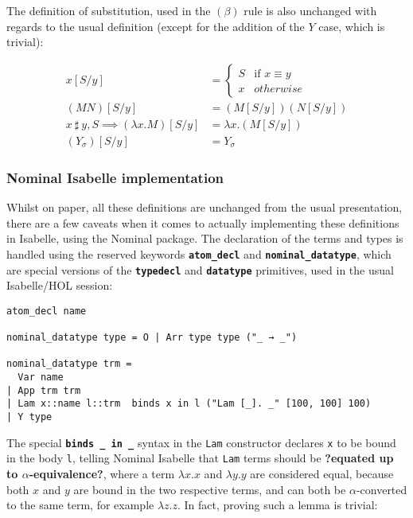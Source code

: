 \documentclass[a4paper, 12pt, twoside]{style/ociamthesis}
\theoremstyle{plain}
\theoremstyle{definition}
\newtheorem{Definition}{Definition}[chapter]
\theoremstyle{remark}
\renewenvironment{Definition}{\begin{OldDefinition}\begin{mdframed}[style=example, linecolor=cyan]}{\end{mdframed}\end{OldDefinition}}
\begin{document}
The definition of substitution, used in the \((\beta)\) rule is also
unchanged with regards to the usual definition (except for the addition
of the \(Y\) case, which is trivial):

\begin{Definition}[Capture-avoiding substitution]

\begin{align*} 
x[S/y] &= \begin{cases}
S & \text{if }x \equiv y\\
x & otherwise
\end{cases}\\
(MN)[S/y] &= (M[S/y])(N[S/y])\\
x\ \sharp\ y , S \implies (\lambda x.M)[S/y] &= \lambda x.(M[S/y])\\
(Y_\sigma)[S/y] &= Y_\sigma
\end{align*}

\end{Definition}

\subsubsection{Nominal Isabelle
implementation}\label{nominal-isabelle-implementation}

Whilst on paper, all these definitions are unchanged from the usual
presentation, there are a few caveats when it comes to actually
implementing these definitions in Isabelle, using the Nominal package.
The declaration of the terms and types is handled using the reserved
keywords \textbf{\texttt{atom\_decl}} and
\textbf{\texttt{nominal\_datatype}}, which are special versions of the
\textbf{\texttt{typedecl}} and \textbf{\texttt{datatype}} primitives,
used in the usual Isabelle/HOL session:

\begin{verbatim}
atom_decl name

nominal_datatype type = O | Arr type type ("_ → _")

nominal_datatype trm =
  Var name
| App trm trm
| Lam x::name l::trm  binds x in l ("Lam [_]. _" [100, 100] 100)
| Y type
\end{verbatim}

The special \textbf{\texttt{binds \_ in \_}} syntax in the \texttt{Lam}
constructor declares \texttt{x} to be bound in the body \texttt{l},
telling Nominal Isabelle that \texttt{Lam} terms should be
\textbf{?equated up to \(\alpha\)-equivalence?}, where a term
\(\lambda x. x\) and \(\lambda y. y\) are considered equal, because both
\(x\) and \(y\) are bound in the two respective terms, and can both be
\(\alpha\)-converted to the same term, for example \(\lambda z .z\). In
fact, proving such a lemma is trivial:
\end{document}

